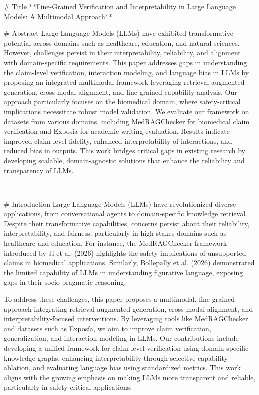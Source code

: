# Title  
**Fine-Grained Verification and Interpretability in Large Language Models: A Multimodal Approach**

# Abstract  
Large Language Models (LLMs) have exhibited transformative potential across domains such as healthcare, education, and natural sciences. However, challenges persist in their interpretability, reliability, and alignment with domain-specific requirements. This paper addresses gaps in understanding the claim-level verification, interaction modeling, and language bias in LLMs by proposing an integrated multimodal framework leveraging retrieval-augmented generation, cross-modal alignment, and fine-grained capability analysis. Our approach particularly focuses on the biomedical domain, where safety-critical implications necessitate robust model validation. We evaluate our framework on datasets from various domains, including MedRAGChecker for biomedical claim verification and Exposía for academic writing evaluation. Results indicate improved claim-level fidelity, enhanced interpretability of interactions, and reduced bias in outputs. This work bridges critical gaps in existing research by developing scalable, domain-agnostic solutions that enhance the reliability and transparency of LLMs.

---

# Introduction  
Large Language Models (LLMs) have revolutionized diverse applications, from conversational agents to domain-specific knowledge retrieval. Despite their transformative capabilities, concerns persist about their reliability, interpretability, and fairness, particularly in high-stakes domains such as healthcare and education. For instance, the MedRAGChecker framework introduced by Ji et al. (2026) highlights the safety implications of unsupported claims in biomedical applications. Similarly, Bollepally et al. (2026) demonstrated the limited capability of LLMs in understanding figurative language, exposing gaps in their socio-pragmatic reasoning.

To address these challenges, this paper proposes a multimodal, fine-grained approach integrating retrieval-augmented generation, cross-modal alignment, and interpretability-focused interventions. By leveraging tools like MedRAGChecker and datasets such as Exposía, we aim to improve claim verification, generalization, and interaction modeling in LLMs. Our contributions include developing a unified framework for claim-level verification using domain-specific knowledge graphs, enhancing interpretability through selective capability ablation, and evaluating language bias using standardized metrics. This work aligns with the growing emphasis on making LLMs more transparent and reliable, particularly in safety-critical applications.

